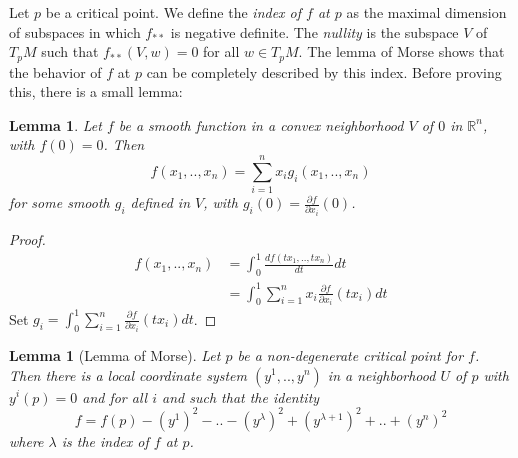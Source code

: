 \documentclass[a4paper,11pt,reqno]{amsart}
\newtheorem{lem}[thm]{Lemma}
\newcommand{\RR}{\mathbb{R}}      %
\begin{document}
Let $p$ be a critical point. We define the \emph{index of $f$ at $p$} as the
maximal dimension of subspaces in which $f_{**}$ is negative definite. The
\emph{nullity} is the subspace $V$ of $T_pM$ such that $f_{**}(V,w) = 0$ for all
$w \in T_pM$. The lemma of Morse shows that the behavior of $f$ at $p$ can be
completely described by this index. Before proving this, there is a small lemma:

\begin{lem}
  Let $f$ be a smooth function in a convex neighborhood $V$ of $0$ in $\RR^n$,
  with $f(0) = 0$. Then
  \begin{equation}
    f(x_1, .., x_n) = \sum_{i=1}^{n} x_ig_i(x_1, .., x_n)
  \end{equation}
  for some smooth $g_i$ defined in $V$, with $g_i(0) = \frac{\partial
    f}{\partial x_i}(0)$.
\end{lem}

\begin{proof}
  \begin{equation}
    \begin{aligned}
      f(x_1, .., x_n) &= \int_0^1 \frac{d f(tx_1, .., tx_n)}{dt} dt \\
                     &= \int_0^1 \sum_{i=1}^{n} x_i\frac{\partial f}{\partial
                       x_i}(tx_i) dt
    \end{aligned}
  \end{equation}
  Set $g_i = \int_0^1 \sum_{i=1}^{n} \frac{\partial f}{\partial x_i}(tx_i) dt$.
\end{proof}

\begin{lem}[Lemma of Morse]
  Let $p$ be a non-degenerate critical point for $f$. Then there is a local
  coordinate system $(y^1, .., y^n)$ in a neighborhood $U$ of $p$ with $y^i(p) =
  0$ and for all $i$ and such that the identity
  \begin{equation}
    f = f(p) - (y^1)^2 - .. - (y^\lambda)^2 + (y^{\lambda+1})^2 + .. + (y^n)^2
  \end{equation}
  where $\lambda$ is the index of $f$ at $p$.
\end{lem}
\end{document}
